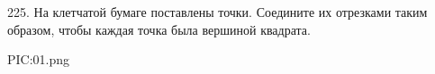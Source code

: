 225. На клетчатой бумаге поставлены точки. Соедините их отрезками таким образом, чтобы каждая точка была вершиной квадрата.
\begin{center}
{{PIC:01.png}}
\end{center}
